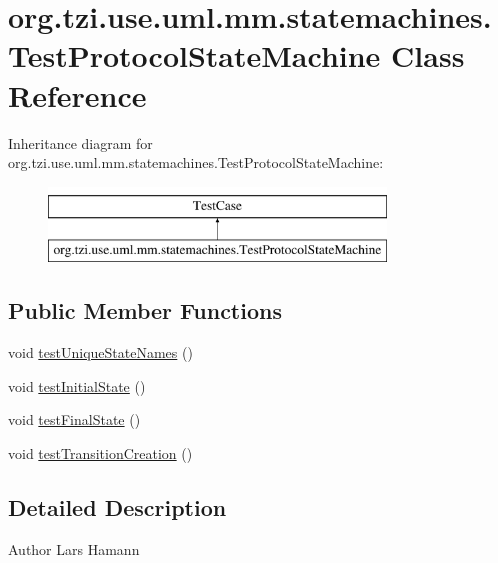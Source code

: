 \hypertarget{classorg_1_1tzi_1_1use_1_1uml_1_1mm_1_1statemachines_1_1_test_protocol_state_machine}{\section{org.\-tzi.\-use.\-uml.\-mm.\-statemachines.\-Test\-Protocol\-State\-Machine Class Reference}
\label{classorg_1_1tzi_1_1use_1_1uml_1_1mm_1_1statemachines_1_1_test_protocol_state_machine}
}
Inheritance diagram for org.\-tzi.\-use.\-uml.\-mm.\-statemachines.\-Test\-Protocol\-State\-Machine\-:\begin{figure}[H]
\begin{center}
\leavevmode
\includegraphics[height=2.000000cm]{classorg_1_1tzi_1_1use_1_1uml_1_1mm_1_1statemachines_1_1_test_protocol_state_machine}
\end{center}
\end{figure}
\subsection*{Public Member Functions}
\begin{DoxyCompactItemize}
\item 
void \hyperlink{classorg_1_1tzi_1_1use_1_1uml_1_1mm_1_1statemachines_1_1_test_protocol_state_machine_ad8483597d751c52af8ca6e5e9f4efc25}{test\-Unique\-State\-Names} ()
\item 
void \hyperlink{classorg_1_1tzi_1_1use_1_1uml_1_1mm_1_1statemachines_1_1_test_protocol_state_machine_a5fcd7e116e8cc6091f66cf8c6ecf0428}{test\-Initial\-State} ()
\item 
void \hyperlink{classorg_1_1tzi_1_1use_1_1uml_1_1mm_1_1statemachines_1_1_test_protocol_state_machine_a68a0b4bf5dd211223d274e7c633e9f82}{test\-Final\-State} ()
\item 
void \hyperlink{classorg_1_1tzi_1_1use_1_1uml_1_1mm_1_1statemachines_1_1_test_protocol_state_machine_aa7c3cac0723100b8f4a58a1e52f69ab1}{test\-Transition\-Creation} ()
\end{DoxyCompactItemize}


\subsection{Detailed Description}
\begin{DoxyAuthor}{Author}
Lars Hamann 
\end{DoxyAuthor}


